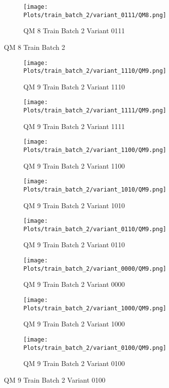 \documentclass{DissertateFigs}
\begin{document}
\begin{figure}[t!]
\medskip

    \begin{subfigure}{0.38\textwidth}
    \texttt{[image: Plots/train\_batch\_2/variant\_0111/QM8.png]}
    \caption{QM 8 Train Batch 2 Variant 0111}
    \end{subfigure}
\caption{QM 8 Train Batch 2}
    \end{figure}
\clearpage
\begin{figure}[t!]
    \begin{subfigure}{0.47\textwidth}
    \texttt{[image: Plots/train\_batch\_2/variant\_1110/QM9.png]}
    \caption{QM 9 Train Batch 2 Variant 1110}
    \end{subfigure}
    \begin{subfigure}{0.47\textwidth}
    \texttt{[image: Plots/train\_batch\_2/variant\_1111/QM9.png]}
    \caption{QM 9 Train Batch 2 Variant 1111}
    \end{subfigure}

\medskip

    \begin{subfigure}{0.47\textwidth}
    \texttt{[image: Plots/train\_batch\_2/variant\_1100/QM9.png]}
    \caption{QM 9 Train Batch 2 Variant 1100}
    \end{subfigure}
    \begin{subfigure}{0.47\textwidth}
    \texttt{[image: Plots/train\_batch\_2/variant\_1010/QM9.png]}
    \caption{QM 9 Train Batch 2 Variant 1010}
    \end{subfigure}

\medskip

    \begin{subfigure}{0.47\textwidth}
    \texttt{[image: Plots/train\_batch\_2/variant\_0110/QM9.png]}
    \caption{QM 9 Train Batch 2 Variant 0110}
    \end{subfigure}
    \begin{subfigure}{0.47\textwidth}
    \texttt{[image: Plots/train\_batch\_2/variant\_0000/QM9.png]}
    \caption{QM 9 Train Batch 2 Variant 0000}
    \end{subfigure}

\medskip

    \begin{subfigure}{0.47\textwidth}
    \texttt{[image: Plots/train\_batch\_2/variant\_1000/QM9.png]}
    \caption{QM 9 Train Batch 2 Variant 1000}
    \end{subfigure}
    \begin{subfigure}{0.47\textwidth}
    \texttt{[image: Plots/train\_batch\_2/variant\_0100/QM9.png]}
    \caption{QM 9 Train Batch 2 Variant 0100}
    \end{subfigure}


\end{figure}
\end{document}
